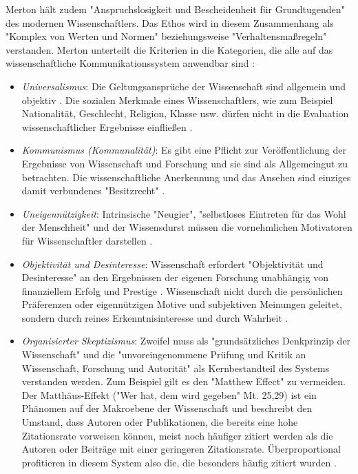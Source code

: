 Merton hält zudem "Anspruchslosigkeit und Bescheidenheit für Grundtugenden" \cite{hagner_2015_sache_buches} des modernen Wissenschaftlers. Das Ethos wird in diesem Zusammenhang als "Komplex von Werten und Normen" \cite{suchen} beziehungsweise "Verhaltensmaßregeln" \cite{suchen} verstanden. Merton unterteilt die Kriterien in die Kategorien, die alle auf das wissenschaftliche Kommunikationssystem anwendbar sind  \cite{Fröhlich_oa_2009}:
\begin{itemize}
\item \textit{Universalismus}: Die Geltungsansprüche der Wissenschaft sind allgemein und objektiv \cite{Oezmen_2015}. Die sozialen Merkmale eines Wissenschaftlers, wie zum Beispiel Nationalität, Geschlecht, Religion, Klasse usw. dürfen nicht in die Evaluation wissenschaftlicher Ergebnisse einfließen \cite{suchen}.
\item \textit{Kommunismus (Kommunalität)}: Es gibt eine Pflicht zur Veröffentlichung der Ergebnisse von Wissenschaft und Forschung und sie sind als Allgemeingut zu betrachten. Die wissenschaftliche Anerkennung und das Ansehen sind einziges damit verbundenes "Besitzrecht" \cite{suchen}.
\item \textit{Uneigennützigkeit}: Intrinsische "Neugier"\cite{suchen}, "selbstloses Eintreten für das Wohl der Menschheit"\cite{suchen} und der Wissensdurst müssen die vornehmlichen Motivatoren für Wissenschaftler darstellen \cite{suchen}.
\item \textit{Objektivität und Desinteresse}: Wissenschaft erfordert "Objektivität und Desinteresse" an den Ergebnissen der eigenen Forschung \cite{suchen} unabhängig von finanziellem Erfolg und Prestige \cite{suchen}. Wissenschaft nicht durch die persönlichen Präferenzen oder eigennützigen Motive und subjektiven Meinungen geleitet, sondern durch reines Erkenntnisinteresse und durch Wahrheit \cite{Oezmen_2015}.
\item \textit{Organisierter Skeptizismus}: Zweifel muss als "grundsätzliches Denkprinzip der Wissenschaft" \cite{suchen} und die "unvoreingenommene Prüfung und Kritik an Wissenschaft, Forschung und Autorität" \cite{suchen} als Kernbestandteil des Systems verstanden werden. Zum Beispiel gilt es den "Matthew Effect" zu vermeiden. Der Matthäus-Effekt ("Wer hat, dem wird gegeben" Mt. 25,29) ist ein Phänomen auf der Makroebene der Wissenschaft \cite{bonitz_1998_matthaus} und  beschreibt den Umstand, dass Autoren oder Publikationen, die bereits eine hohe Zitationsrate vorweisen können, meist noch häufiger zitiert werden als die Autoren oder Beiträge mit einer geringeren Zitationsrate. Überproportional profitieren in diesem System also die, die besonders häufig zitiert wurden \cite{Merton_1968} \cite{meier_2009_matthaus}.
\end{itemize}

